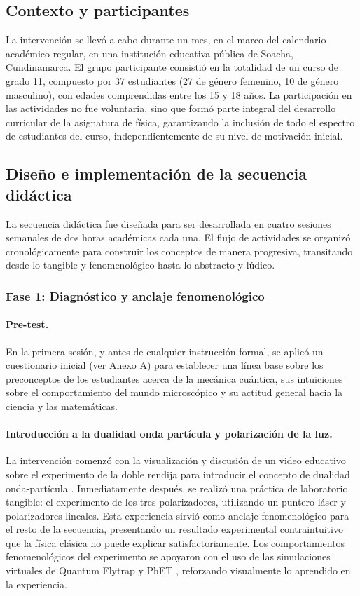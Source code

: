 \documentclass[10pt,a4paper]{article}
\begin{document}
\subsection{Contexto y participantes}
La intervención se llevó a cabo durante un mes, en el marco del calendario académico regular, en una institución educativa pública de Soacha, Cundinamarca. El grupo participante consistió en la totalidad de un curso de grado 11, compuesto por 37 estudiantes (27 de género femenino, 10 de género masculino), con edades comprendidas entre los 15 y 18 años. La participación en las actividades no fue voluntaria, sino que formó parte integral del desarrollo curricular de la asignatura de física, garantizando la inclusión de todo el espectro de estudiantes del curso, independientemente de su nivel de motivación inicial.

\subsection{Diseño e implementación de la secuencia didáctica}
La secuencia didáctica fue diseñada para ser desarrollada en cuatro sesiones semanales de dos horas académicas cada una. El flujo de actividades se organizó cronológicamente para construir los conceptos de manera progresiva, transitando desde lo tangible y fenomenológico hasta lo abstracto y lúdico.

\subsubsection{Fase 1: Diagnóstico y anclaje fenomenológico}
\paragraph{Pre-test.} En la primera sesión, y antes de cualquier instrucción formal, se aplicó un cuestionario inicial (ver Anexo A) para establecer una línea base sobre los preconceptos de los estudiantes acerca de la mecánica cuántica, sus intuiciones sobre el comportamiento del mundo microscópico y su actitud general hacia la ciencia y las matemáticas.

\paragraph{Introducción a la dualidad onda partícula y polarización de la luz.} La intervención comenzó con la visualización y discusión de un video educativo sobre el experimento de la doble rendija para introducir el concepto de dualidad onda-partícula \cite{videoDobleRendija}. Inmediatamente después, se realizó una práctica de laboratorio tangible: el experimento de los tres polarizadores, utilizando un puntero láser y polarizadores lineales. Esta experiencia sirvió como anclaje fenomenológico para el resto de la secuencia, presentando un resultado experimental contraintuitivo que la física clásica no puede explicar satisfactoriamente. Los comportamientos fenomenológicos del experimento se apoyaron con el uso de las simulaciones virtuales de Quantum Flytrap \cite{VisualizingQuantumMechanics2022} y PhET \cite{PhET}, reforzando visualmente lo aprendido en la experiencia.
\end{document}

